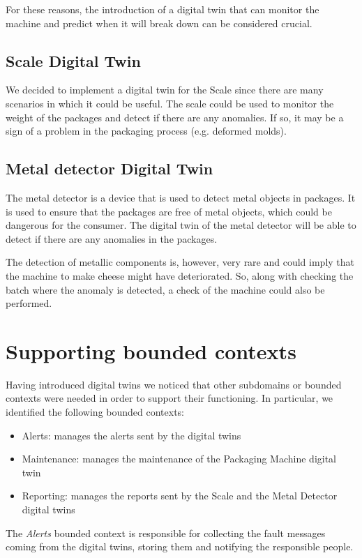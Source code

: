 For these reasons, the introduction of a digital twin that can monitor the machine and predict when it will break down can be considered crucial.

\subsection{Scale Digital Twin}
We decided to implement a digital twin for the Scale since there are many scenarios in which it could be useful.
The scale could be used to monitor the weight of the packages and detect if there are any anomalies. If so, it may be a sign of a problem in the packaging process (e.g. deformed molds).

\subsection{Metal detector Digital Twin}
The metal detector is a device that is used to detect metal objects in packages. It is used to ensure that the packages are free of metal objects, which could be dangerous for the consumer.
The digital twin of the metal detector will be able to detect if there are any anomalies in the packages.

The detection of metallic components is, however, very rare and could imply that the machine to make cheese might have deteriorated. So, along with checking the batch where the anomaly is detected, a check of the machine could also be performed.


\section{Supporting bounded contexts}
Having introduced digital twins we noticed that other subdomains or bounded contexts were needed in order to support their functioning.
In particular, we identified the following bounded contexts:
\begin{itemize}
    \item Alerts: manages the alerts sent by the digital twins
    \item Maintenance: manages the maintenance of the Packaging Machine digital twin
    \item Reporting: manages the reports sent by the Scale and the Metal Detector digital twins
\end{itemize}

The \textit{Alerts} bounded context is responsible for collecting the fault messages coming from the digital twins, storing them and notifying the responsible people.


